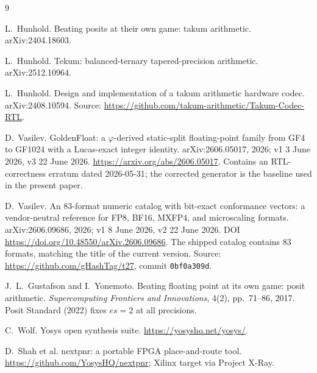 \documentclass[11pt]{article}
\theoremstyle{definition}
\begin{document}
\begin{thebibliography}{9}

L.~Hunhold.
\newblock Beating posits at their own game: takum arithmetic.
\newblock arXiv:2404.18603.

L.~Hunhold.
\newblock Tekum: balanced-ternary tapered-precision arithmetic.
\newblock arXiv:2512.10964.

L.~Hunhold.
\newblock Design and implementation of a takum arithmetic hardware codec.
\newblock arXiv:2408.10594. Source: \url{https://github.com/takum-arithmetic/Takum-Codec-RTL}.

D.~Vasilev.
\newblock GoldenFloat: a $\varphi$-derived static-split floating-point family
from GF4 to GF1024 with a Lucas-exact integer identity.
\newblock arXiv:2606.05017, 2026; v1 3 June 2026, v3 22 June 2026.
\newblock \url{https://arxiv.org/abs/2606.05017}.
\newblock Contains an RTL-correctness erratum dated 2026-05-31; the corrected
generator is the baseline used in the present paper.

D.~Vasilev.
\newblock An 83-format numeric catalog with bit-exact conformance vectors: a
vendor-neutral reference for FP8, BF16, MXFP4, and microscaling formats.
\newblock arXiv:2606.09686, 2026; v1 8 June 2026, v2 22 June 2026.
\newblock DOI \url{https://doi.org/10.48550/arXiv.2606.09686}.
\newblock The shipped catalog contains 83 formats, matching the title of the
current version. Source: \url{https://github.com/gHashTag/t27}, commit
\texttt{0bf0a309d}.

J.~L.~Gustafson and I.~Yonemoto.
\newblock Beating floating point at its own game: posit arithmetic.
\newblock \emph{Supercomputing Frontiers and Innovations}, 4(2), pp.~71--86, 2017.
\newblock Posit Standard (2022) fixes $es=2$ at all precisions.

C.~Wolf.
\newblock Yosys open synthesis suite.
\newblock \url{https://yosyshq.net/yosys/}.

D.~Shah et al.
\newblock nextpnr: a portable FPGA place-and-route tool.
\newblock \url{https://github.com/YosysHQ/nextpnr}; Xilinx target via Project X-Ray.


\end{thebibliography}
\end{document}
